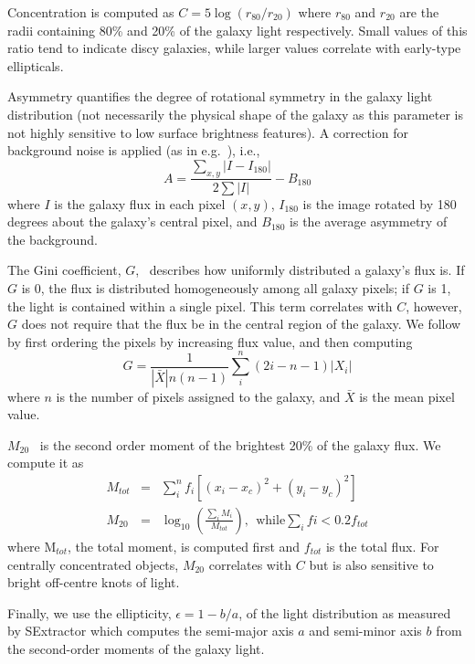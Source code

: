 \documentclass[twocolumn,  trackchanges, ]{aastex6}%
\newcommand{\rr}[1]{$r_{#1}$}
\newcommand{\M}[1]{$M_{\mathrm{#1}}$}
\begin{document}
Concentration is computed as $C = 5\log(r_{80}/ r_{20})$ where \rr{80} and \rr{20} are the radii containing 80\% and 20\% of the galaxy light respectively.  Small values of this ratio tend to indicate discy galaxies, while larger values correlate with early-type ellipticals. 

Asymmetry quantifies the degree of rotational symmetry in the galaxy light distribution
 (not necessarily the physical shape of the galaxy as this parameter is not highly sensitive 
to low surface brightness features). A correction for background noise is applied (as in e.g.~\cite{Conselice2000}), i.e., 
\begin{equation}
A = \frac{\sum_{x,y} |I - I_{180}|}{ 2\sum|I|} - B_{180}
\end{equation}
where $I$ is the galaxy flux in each pixel $(x, y)$, $I_{180}$ is the image rotated by 180 degrees about the galaxy's central pixel, and $B_{180}$ is the average asymmetry of the background. 

The Gini coefficient, $G$,~\citep{Glasser1962, Abraham2003} describes how uniformly distributed a galaxy's flux is.  If $G$ is 0, the flux is distributed homogeneously among all galaxy pixels; if $G$ is 1,  the light is contained within a single pixel. This term correlates with $C$, however, $G$ does not require that the flux be in the central region of the galaxy.  We follow~\cite{Lotz2004} by first ordering the pixels by increasing flux value, and then computing
\begin{equation}
G = \frac{1}{|\bar X|n(n-1)}\sum_i^n(2i-n-1)|X_i|
\end{equation}
where $n$ is the number of pixels assigned to the galaxy, and $\bar X$ is the mean pixel value. 

\M{20}~\citep{Lotz2004} is the second order moment of the brightest 20\% of the galaxy flux. We compute it as
\begin{eqnarray}
 M_{tot} & = & \sum_i^nf_i[(x_i-x_c)^2 + (y_i-y_c)^2]  \\
 M_{20} & = & \log_{10} (\frac{\sum_iM_i}{M_{tot}}), ~~\textrm{while} \sum_ifi < 0.2f_{tot}
\end{eqnarray}
where M$_{tot}$, the total moment, is computed first and $f_{tot}$ is the total flux. For centrally concentrated objects, \M{20} correlates with $C$ but is also sensitive to bright off-centre knots of light. 

Finally, we use the ellipticity, $\epsilon = 1 - b/a$, of the light distribution as measured by SExtractor which computes the semi-major axis $a$ and semi-minor axis $b$ from the second-order moments of the galaxy light.  
\end{document}
